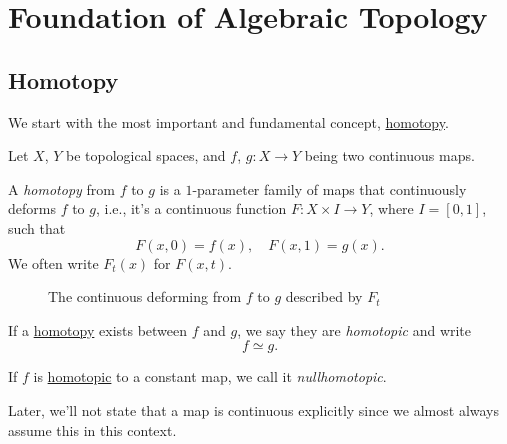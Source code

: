\chapter{Foundation of Algebraic Topology}
\section{Homotopy}
We start with the most important and fundamental concept, \hyperref[def:homotopy]{homotopy}.
\begin{definition*}
	Let \(X\), \(Y\) be topological spaces, and \(f\), \(g\colon X\to Y\) being two continuous maps.
	\begin{definition}[Homotopy]\label{def:homotopy}
		A \emph{homotopy} from \(f\) to \(g\) is a \(1\)-parameter family of maps that continuously deforms \(f\) to \(g\), i.e., it's a continuous function
		\(F\colon X\times I\to Y\), where \(I=\left[0,1\right]\), such that
		\[
			F(x, 0) = f(x),\quad F(x, 1) = g(x).
		\]
		We often write \(F_{t}(x)\) for \(F(x, t)\).
		\begin{figure}[H]
			\centering
			\caption{The continuous deforming from \(f\) to \(g\) described by \(F_t\)}
			\label{fig:def:homotopy}
		\end{figure}
	\end{definition}
	\begin{definition}[Homotopic]\label{def:homotopic}
		If a \hyperref[def:homotopy]{homotopy} exists between \(f\) and \(g\), we say they are \emph{homotopic} and write
		\[
			f\simeq g.
		\]
	\end{definition}
	\begin{definition}[Nullhomotopic]\label{def:nullhomotopic}
		If \(f\) is \hyperref[def:homotopic]{homotopic} to a constant map, we call it \emph{nullhomotopic}.
	\end{definition}

\end{definition*}

\begin{remark}
	Later, we'll not state that a map is continuous explicitly since we almost always assume this in this context.
\end{remark}

